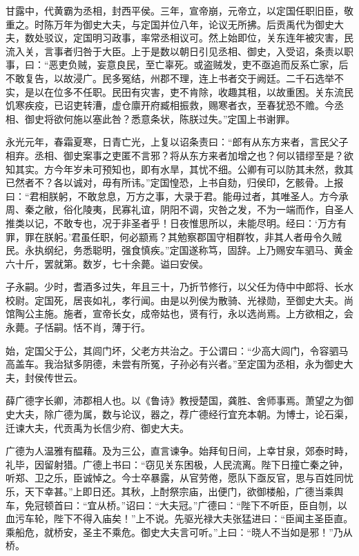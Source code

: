 \documentclass[12pt,UTF8]{ctexbook}
\begin{document}
甘露中，代黄霸为丞相，封西平侯。三年，宣帝崩，元帝立，以定国任职旧臣，敬重之。时陈万年为御史大夫，与定国并位八年，论议无所拂。后贡禹代为御史大夫，数处驳议，定国明习政事，率常丞相议可。然上始即位，关东连年被灾害，民流入关，言事者归咎于大臣。上于是数以朝日引见丞相、御史，入受诏，条责以职事，曰：“恶吏负贼，妄意良民，至亡辜死。或盗贼发，吏不亟追而反系亡家，后不敢复告，以故浸广。民多冤结，州郡不理，连上书者交于阙廷。二千石选举不实，是以在位多不任职。民田有灾害，吏不肯除，收趣其租，以故重困。关东流民饥寒疾疫，已诏吏转漕，虚仓廪开府臧相振救，赐寒者衣，至春犹恐不赡。今丞相、御史将欲何施以塞此咎？悉意条状，陈朕过失。”定国上书谢罪。



永光元年，春霜夏寒，日青亡光，上复以诏条责曰：“郎有从东方来者，言民父子相弃。丞相、御史案事之吏匿不言邪？将从东方来者加增之也？何以错缪至是？欲知其实。方今年岁未可预知也，即有水旱，其忧不细。公卿有可以防其未然，救其已然者不？各以诚对，毋有所讳。”定国惶恐，上书自劾，归侯印，乞骸骨。上报曰：“君相朕躬，不敢怠息，万方之事，大录于君。能毋过者，其唯圣人。方今承周、秦之敝，俗化陵夷，民寡礼谊，阴阳不调，灾咎之发，不为一端而作，自圣人推类以记，不敢专也，况于非圣者乎！日夜惟思所以，未能尽明。经曰：‘万方有罪，罪在朕躬。’君虽任职，何必颛焉？其勉察郡国守相群牧，非其人者毋令久贼民。永执纲纪，务悉聪明，强食慎疾。”定国遂称笃，固辞。上乃赐安车驷马、黄金六十斤，罢就第。数岁，七十余薨。谥曰安侯。



子永嗣。少时，耆酒多过失，年且三十，乃折节修行，以父任为侍中中郎将、长水校尉。定国死，居丧如礼，孝行闻。由是以列侯为散骑、光禄勋，至御史大夫。尚馆陶公主施。施者，宣帝长女，成帝姑也，贤有行，永以选尚焉。上方欲相之，会永薨。子恬嗣。恬不肖，薄于行。



始，定国父于公，其闾门坏，父老方共治之。于公谓曰：“少高大闾门，令容驷马高盖车。我治狱多阴德，未尝有所冤，子孙必有兴者。”至定国为丞相，永为御史大夫，封侯传世云。



薛广德字长卿，沛郡相人也。以《鲁诗》教授楚国，龚胜、舍师事焉。萧望之为御史大夫，除广德为属，数与论议，器之，荐广德经行宜充本朝。为博士，论石渠，迁谏大夫，代贡禹为长信少府、御史大夫。



广德为人温雅有醖藉。及为三公，直言谏争。始拜旬日间，上幸甘泉，郊泰时畤，礼毕，因留射猎。广德上书曰：“窃见关东困极，人民流离。陛下日撞亡秦之钟，听郑、卫之乐，臣诚悼之。今士卒暴露，从官劳倦，愿队下亟反官，思与百姓同忧乐，天下幸甚。”上即日还。其秋，上酎祭宗庙，出便门，欲御楼船，广德当乘舆车，免冠顿首曰：“宜从桥。”诏曰：“大夫冠。”广德曰：“陛下不听臣，臣自刎，以血污车轮，陛下不得入庙矣！”上不说。先驱光禄大夫张猛进曰：“臣闻主圣臣直。乘船危，就桥安，圣主不乘危。御史大夫言可听。”上曰：“晓人不当如是邪！”乃从桥。
\end{document}
